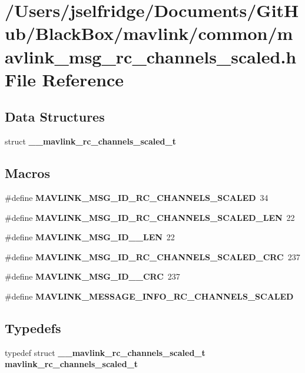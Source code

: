 \section{/\+Users/jselfridge/\+Documents/\+Git\+Hub/\+Black\+Box/mavlink/common/mavlink\+\_\+msg\+\_\+rc\+\_\+channels\+\_\+scaled.h File Reference}
\label{mavlink__msg__rc__channels__scaled_8h}
\subsection*{Data Structures}
\begin{DoxyCompactItemize}
\item 
struct \textbf{ \+\_\+\+\_\+mavlink\+\_\+rc\+\_\+channels\+\_\+scaled\+\_\+t}
\end{DoxyCompactItemize}
\subsection*{Macros}
\begin{DoxyCompactItemize}
\item 
\#define \textbf{ M\+A\+V\+L\+I\+N\+K\+\_\+\+M\+S\+G\+\_\+\+I\+D\+\_\+\+R\+C\+\_\+\+C\+H\+A\+N\+N\+E\+L\+S\+\_\+\+S\+C\+A\+L\+ED}~34
\item 
\#define \textbf{ M\+A\+V\+L\+I\+N\+K\+\_\+\+M\+S\+G\+\_\+\+I\+D\+\_\+\+R\+C\+\_\+\+C\+H\+A\+N\+N\+E\+L\+S\+\_\+\+S\+C\+A\+L\+E\+D\+\_\+\+L\+EN}~22
\item 
\#define \textbf{ M\+A\+V\+L\+I\+N\+K\+\_\+\+M\+S\+G\+\_\+\+I\+D\+\_\+\_\+\+L\+EN}~22
\item 
\#define \textbf{ M\+A\+V\+L\+I\+N\+K\+\_\+\+M\+S\+G\+\_\+\+I\+D\+\_\+\+R\+C\+\_\+\+C\+H\+A\+N\+N\+E\+L\+S\+\_\+\+S\+C\+A\+L\+E\+D\+\_\+\+C\+RC}~237
\item 
\#define \textbf{ M\+A\+V\+L\+I\+N\+K\+\_\+\+M\+S\+G\+\_\+\+I\+D\+\_\+\_\+\+C\+RC}~237
\item 
\#define \textbf{ M\+A\+V\+L\+I\+N\+K\+\_\+\+M\+E\+S\+S\+A\+G\+E\+\_\+\+I\+N\+F\+O\+\_\+\+R\+C\+\_\+\+C\+H\+A\+N\+N\+E\+L\+S\+\_\+\+S\+C\+A\+L\+ED}
\end{DoxyCompactItemize}
\subsection*{Typedefs}
\begin{DoxyCompactItemize}
\item 
typedef struct \textbf{ \+\_\+\+\_\+mavlink\+\_\+rc\+\_\+channels\+\_\+scaled\+\_\+t} \textbf{ mavlink\+\_\+rc\+\_\+channels\+\_\+scaled\+\_\+t}
\end{DoxyCompactItemize}


